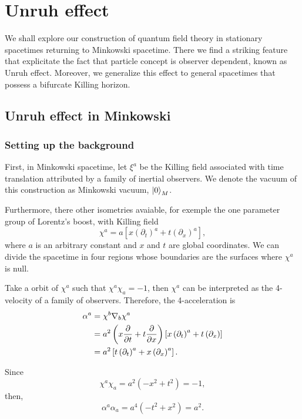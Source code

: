 \chapter{Unruh effect}
We shall explore our construction of quantum field theory in stationary spacetimes returning to Minkowski spacetime. There we find a striking feature that explicitate the fact that particle concept is observer dependent, known as Unruh effect. Moreover, we generalize this effect to general spacetimes that possess a bifurcate Killing horizon.

\section{Unruh effect in Minkowski}
\subsection*{Setting up the background}
First, in Minkowski spacetime, let \(\xi^a\) be the Killing field associated with time translation attributed by a family of inertial observers. We denote the vacuum of this construction as Minkowski vacuum, \(\ket{0}_M\).

Furthermore, there other isometries avaiable, for exemple the one parameter group of Lorentz's boost, with Killing field
\begin{equation}
    \chi^a=a\left[x\left(\partial_t\right)^a+t\left(\partial_x\right)^a\right],
\end{equation}
where \(a\) is an arbitrary constant and \(x\) and \(t\) are global coordinates. We can divide the spacetime in four regions whose boundaries are the surfaces where \(\chi^a\) is null.

Take a orbit of \(\chi^a\) such that \(\chi^a\chi_a=-1\), then \(\chi^a\) can be interpreted as the 4-velocity of a family of observers. Therefore, the 4-acceleration is
\begin{subequations}
    \begin{align}
        \alpha^a&=\chi^b\nabla_b\chi^a\\
        &=a^2\left(x\diffp{}{t}+t\diffp{}{x}\right)\left[x\left(\partial_t\right)^a+t\left(\partial_x\right)\right]\\
        &=a^2\left[t\left(\partial_t\right)^a+x\left(\partial_x\right)^a\right].
    \end{align}
\end{subequations}

Since 
\begin{equation}
    \chi^a\chi_a=a^2\left(-x^2+t^2\right)=-1,
\end{equation}
then,
\begin{equation}
    \alpha^a\alpha_a=a^4\left(-t^2+x^2\right)=a^2.
\end{equation}

